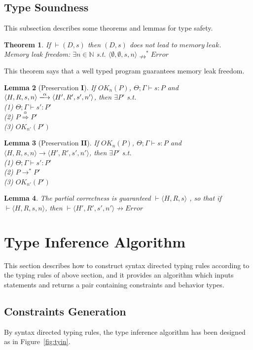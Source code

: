 \documentclass[english]{jssst_ppl} %
\newtheorem{theorem}{Theorem}[section]
\newtheorem{lemma}[theorem]{Lemma}
\theoremstyle{definition}
\begin{document}
\subsection{Type Soundness}
This subsection describes some theorems and lemmas for type safety.
\begin{theorem}\label{thm1}
If $\vdash (D, s)$ then $(D, s)$ does not lead to $memory\;leak$.\\
Memory leak freedom: $\exists n \in \mathbb{N}$ s.t.
$\langle \emptyset, \emptyset, s, n \rangle \nrightarrow^{*}Error$
\end{theorem}
\noindent
This theorem says that a well typed program guarantees memory leak freedom.
\begin{lemma}[Preservation $\mathbf{I}$]%
If $OK_{n}(P)$, $\Theta; \Gamma \vdash s : P$ and $\langle H,R,s, n \rangle
\xlongrightarrow{\alpha}\langle H',R',s', n'
\rangle$, then $\exists P'$ s.t. \\
(1) $ \Theta; \Gamma \vdash s' : P' $ \\
(2) $ P \overset{\text{$\alpha$}}{\Longrightarrow} P'$\\
(3) $ OK_{n'}(P') $
\end{lemma}
\begin{lemma}[Preservation $\mathbf{II}$]%
If $OK_{n}(P)$, $\Theta ; \Gamma \vdash s : P$ and $\langle H,R,s,n \rangle
\rightarrow \langle H',R',s', n'
\rangle$, then $\exists P'$ s.t. \\
(1) $\Theta; \Gamma \vdash s' : P'$\\
(2) $ P \rightarrow^{*} P'  $\\
(3) $OK_{n'}(P')$
\end{lemma}
\begin{lemma}%
 The partial correctness is guaranteed $\vdash \langle H,R,s \rangle$ , so that if $\vdash \langle H,R,s,n \rangle$, then $\vdash \langle H',R',s',n' \rangle \nrightarrow Error$
\end{lemma}
\section{Type Inference Algorithm}
This section describes how to construct syntax directed typing rules according to the typing rules of above section, and it provides an algorithm which inputs statements and returns a pair containing constraints and behavior types.
\subsection{Constraints Generation}
By syntax directed typing rules, the type inference algorithm has been designed as in Figure~\ref{fig:tyin}.
\end{document}
